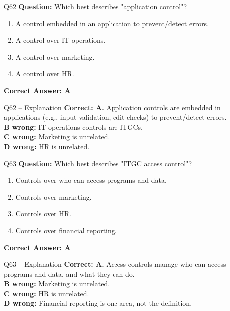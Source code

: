 \documentclass[aspectratio=169,10pt]{beamer}
\begin{document}
	\begin{frame}[t]{Q62}
		\small
		\textbf{Question:} Which best describes "application control"?
		\begin{enumerate}[label=\Alph*.,itemsep=1pt,topsep=2pt]
			\item A control embedded in an application to prevent/detect errors.
			\item A control over IT operations.
			\item A control over marketing.
			\item A control over HR.
		\end{enumerate}
		\vspace{4pt}
		\textbf{Correct Answer: A}
	\end{frame}
	
	\begin{frame}[t]{Q62 -- Explanation}
		\small
		\textbf{Correct: A.} Application controls are embedded in applications (e.g., input validation, edit checks) to prevent/detect errors. \\[4pt]
		\textbf{B wrong:} IT operations controls are ITGCs. \\[2pt]
		\textbf{C wrong:} Marketing is unrelated. \\[2pt]
		\textbf{D wrong:} HR is unrelated.
	\end{frame}
	
	\begin{frame}[t]{Q63}
		\small
		\textbf{Question:} Which best describes "ITGC access control"?
		\begin{enumerate}[label=\Alph*.,itemsep=1pt,topsep=2pt]
			\item Controls over who can access programs and data.
			\item Controls over marketing.
			\item Controls over HR.
			\item Controls over financial reporting.
		\end{enumerate}
		\vspace{4pt}
		\textbf{Correct Answer: A}
	\end{frame}
	
	\begin{frame}[t]{Q63 -- Explanation}
		\small
		\textbf{Correct: A.} Access controls manage who can access programs and data, and what they can do. \\[4pt]
		\textbf{B wrong:} Marketing is unrelated. \\[2pt]
		\textbf{C wrong:} HR is unrelated. \\[2pt]
		\textbf{D wrong:} Financial reporting is one area, not the definition.
	\end{frame}
	
\end{document}
